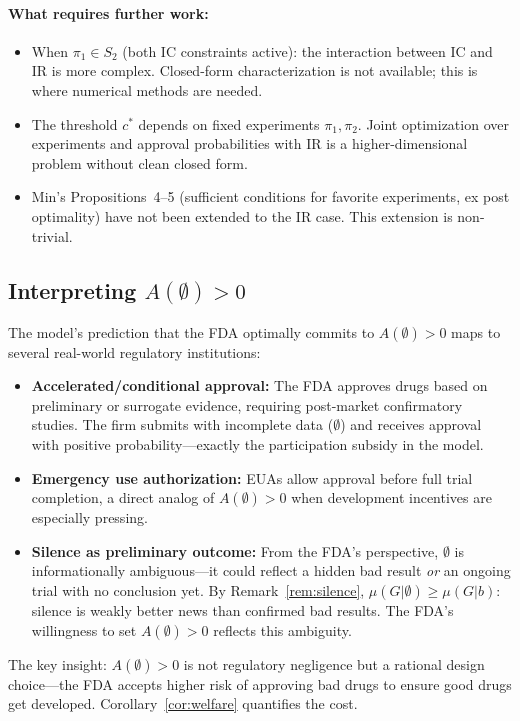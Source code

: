 \documentclass[12pt,a4paper]{article}
\begin{document}
\paragraph{What requires further work:}
\begin{itemize}
  \item When $\pi_1 \in S_2$ (both IC constraints active):
    the interaction between IC and IR is more complex.
    Closed-form characterization is not available; this is
    where numerical methods are needed.
  \item The threshold $c^*$ depends on fixed experiments
    $\pi_1, \pi_2$. Joint optimization over experiments
    and approval probabilities with IR is a
    higher-dimensional problem without clean closed form.
  \item Min's Propositions~4--5 (sufficient conditions for
    favorite experiments, ex post optimality) have not been
    extended to the IR case. This extension is non-trivial.
\end{itemize}


\subsection{Interpreting $A(\emptyset) > 0$}

The model's prediction that the FDA optimally commits to
$A(\emptyset) > 0$ maps to several real-world regulatory
institutions:
\begin{itemize}
  \item \textbf{Accelerated/conditional approval:}
    The FDA approves drugs based on preliminary or surrogate
    evidence, requiring post-market confirmatory studies.
    The firm submits with incomplete data ($\emptyset$) and
    receives approval with positive probability---exactly
    the participation subsidy in the model.

  \item \textbf{Emergency use authorization:}
    EUAs allow approval before full trial completion, a
    direct analog of $A(\emptyset) > 0$ when development
    incentives are especially pressing.

  \item \textbf{Silence as preliminary outcome:}
    From the FDA's perspective, $\emptyset$ is
    informationally ambiguous---it could reflect a hidden
    bad result \emph{or} an ongoing trial with no
    conclusion yet. By Remark~\ref{rem:silence},
    $\mu(G|\emptyset) \geq \mu(G|b)$: silence is weakly
    better news than confirmed bad results. The FDA's
    willingness to set $A(\emptyset) > 0$ reflects this
    ambiguity.
\end{itemize}
The key insight: $A(\emptyset) > 0$ is not regulatory
negligence but a rational design choice---the FDA accepts
higher risk of approving bad drugs to ensure good drugs get
developed. Corollary~\ref{cor:welfare} quantifies the cost.
\end{document}
